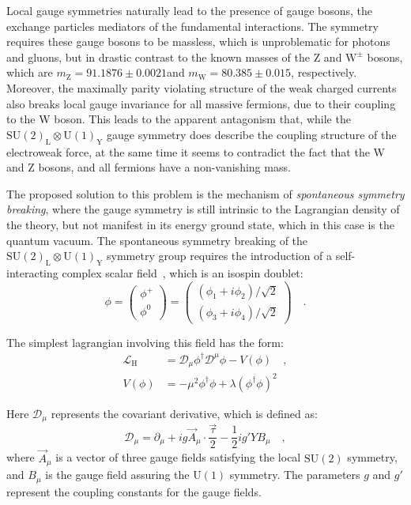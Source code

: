 Local gauge symmetries naturally lead to the presence of gauge bosons, the exchange particles mediators of the fundamental interactions. The symmetry requires these gauge bosons to be massless, which is unproblematic for photons and gluons, but in drastic contrast to the known masses of the Z and $\mathrm{W^\pm}$ bosons, which are $m_\mathrm{Z} = 91.1876 \pm 0.0021$\GeV and $m_\mathrm{W} = 80.385 \pm 0.015$\GeV, respectively. Moreover, the maximally parity violating structure of the weak charged currents also breaks local gauge invariance for all massive fermions, due to their coupling to the W boson. This leads to the apparent antagonism that, while the $\mathrm{SU(2)_L \otimes U(1)_Y}$ gauge symmetry does describe the coupling structure of the electroweak force, at the same time it seems to contradict the fact that the W and Z bosons, and all fermions have a non-vanishing mass. 

The proposed solution to this problem is the mechanism of \emph{spontaneous symmetry breaking}, where the gauge symmetry is still intrinsic to the Lagrangian density of the theory, but not manifest in its energy ground state, which in this case is the quantum vacuum. The spontaneous symmetry breaking of the $\mathrm{SU(2)_L \otimes U(1)_Y}$ symmetry group requires the introduction of a self-interacting complex scalar field~\cite{Wolf:2015kua}, which is an isospin doublet:
\begin{equation}
\phi = \begin{pmatrix} \phi^+       \\ \phi^0      \end{pmatrix} = \begin{pmatrix} (\phi_1+i\phi_2)/\sqrt{2}       \\ (\phi_3+i\phi_4)/\sqrt{2}      \end{pmatrix} \quad .
\end{equation}

\noindent The simplest lagrangian involving this field has the form:
\begin{equation}\label{eq:higgsL}
\begin{split}
\mathcal{L}_\mathrm{H} &= \mathcal{D}_\mu \phi^\dagger \mathcal{D}^\mu \phi - V(\phi) \quad,\\
V(\phi) &= -\mu^2\phi^\dagger\phi + \lambda(\phi^\dagger\phi)^2
\end{split}
\end{equation}

\noindent Here $\mathcal{D}_\mu$ represents the covariant derivative, which is defined as:
\begin{equation}
\mathcal{D}_\mu = \partial_\mu + i g \vec{A}_\mu \cdot \frac{\vec{\tau}}{2} - \frac{1}{2}i g' Y B_\mu \quad ,
\end{equation}
\noindent where $\vec{A}_\mu$ is a vector of three gauge fields satisfying the local $\mathrm{SU(2)}$ symmetry, and $B_\mu$ is the gauge field assuring the $\mathrm{U(1)}$ symmetry. The parameters $g$ and $g'$ represent the coupling constants for the gauge fields.


